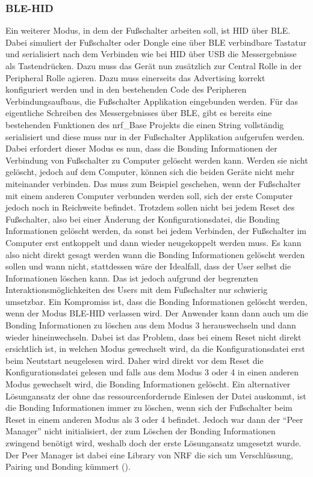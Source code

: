 \subsubsection{BLE-HID}
Ein weiterer Modus, in dem der Fußschalter arbeiten soll, ist \ac{HID} über \ac{BLE}. Dabei simuliert der Fußschalter oder Dongle eine über \ac{BLE} verbindbare Tastatur und serialisiert nach dem Verbinden wie bei \ac{HID} über \ac{USB} die Messergebnisse als Tastendrücken. Dazu muss das Gerät nun zusätzlich zur Central Rolle in der Peripheral Rolle agieren. Dazu muss einerseits das Advertising korrekt konfiguriert werden und in den bestehenden Code des Peripheren Verbindungsaufbaus, die Fußschalter Applikation eingebunden werden. Für das eigentliche Schreiben des Messergebnisses über \ac{BLE}, gibt es bereits eine bestehenden Funktionen des nrf\_Base Projekts die einen String vollständig serialisiert und diese muss nur in der Fußschalter Applikation aufgerufen werden.\\
Dabei erfordert dieser Modus es nun, dass die Bonding Informationen der Verbindung von Fußschalter zu Computer gelöscht werden kann. Werden sie nicht gelöscht, jedoch auf dem Computer, können sich die beiden Geräte nicht mehr miteinander verbinden. Das muss zum Beispiel geschehen, wenn der Fußschalter mit einem anderen Computer verbunden werden soll, sich der erste Computer jedoch noch in Reichweite befindet. Trotzdem sollen nicht bei jedem Reset des Fußschalter, also bei einer Änderung der Konfigurationsdatei, die Bonding Informationen gelöscht werden, da sonst bei jedem Verbinden, der Fußschalter im Computer erst entkoppelt und dann wieder neugekoppelt werden muss. Es kann also nicht direkt gesagt werden wann die Bonding Informationen gelöscht werden sollen und wann nicht, stattdessen wäre der Idealfall, dass der User selbst die Informationen löschen kann. Das ist jedoch aufgrund der begrenzten Interaktionsmöglichkeiten des Users mit dem Fußschalter nur schwierig umsetzbar. Ein Kompromiss ist, dass die Bonding Informationen gelöscht werden, wenn der Modus \ac{BLE}-\ac{HID} verlassen wird. Der Anwender kann dann auch um die Bonding Informationen zu löschen aus dem Modus 3 herauswechseln und dann wieder hineinwechseln. Dabei ist das Problem, dass bei einem Reset nicht direkt ersichtlich ist, in welchen Modus gewechselt wird, da die Konfigurationsdatei erst beim Neutstart neugelesen wird. Daher wird direkt vor dem Reset die Konfigurationsdatei gelesen und falls aus dem Modus 3 oder 4 in einen anderen Modus gewechselt wird, die Bonding Informationen gelöscht. Ein alternativer Lösungansatz der ohne das ressourcenfordernde Einlesen der Datei auskommt, ist die Bonding Informationen immer zu löschen, wenn sich der Fußschalter beim Reset in einem anderen Modus als 3 oder 4 befindet. Jedoch war dann der ``Peer Manager'' nicht initialisiert, der zum Löschen der Bonding Informationen zwingend benötigt wird, weshalb doch der erste Lösungansatz umgesetzt wurde. Der Peer Manager ist dabei eine Library von NRF die sich um Verschlüssung, Pairing und Bonding kümmert (\cite[]{NRF_PeerManager}).\\
